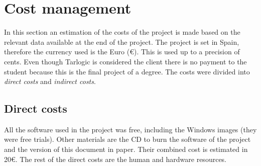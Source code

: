 \section{Cost management}
In this section an estimation of the costs of the project is made based on the relevant data available at the end of the project.
\linej
The project is set in Spain, therefore the currency used is the Euro (\euro{}). This is used up to a precision of cents.
\linej
Even though Tarlogic is considered the client there is no payment to the student because this is the final project of a degree.
\linej
The costs were divided into \textit{direct costs} and \textit{indirect costs}.

\subsection{Direct costs}
All the software used in the project was free, including the Windows images (they were free trials).
\linej
\linej
Other materials are the CD to burn the software of the project and the version of this document in paper.
Their combined cost is estimated in 20\euro{}.
\linej
\linej
The rest of the direct costs are the human and hardware resources.

